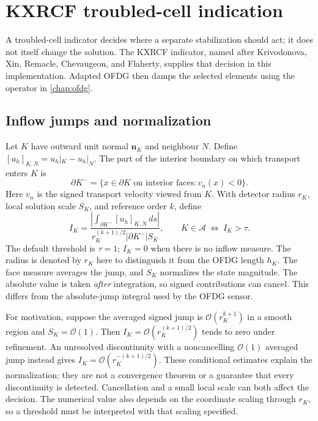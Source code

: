 \section{KXRCF troubled-cell indication}
\label{chap:kxrcf}
A troubled-cell indicator decides where a separate stabilization should act;
it does not itself change the solution. The KXRCF indicator, named after
Krivodonova, Xin, Remacle, Chevaugeon, and Flaherty, supplies that decision in
this implementation. Adapted OFDG then damps the selected elements using the
operator in \cref{chap:ofdg}.


\subsection{Inflow jumps and normalization}
Let $K$ have outward unit normal $\boldsymbol n_K$ and neighbour $N$. Define
$[u_h]_{K,N}=u_h|_K-u_h|_N$. The part of the interior boundary on which
transport enters $K$ is
\begin{equation}
 \partial K^- =\{x\in\partial K\text{ on interior faces}:
                         v_n(x)<0\}.
 \label{eq:kxrcf-inflow}
\end{equation}
Here $v_n$ is the signed transport velocity viewed from $K$. With detector
radius $r_K$, local solution scale $S_K$, and reference order $k$, define
\begin{equation}
 I_K=\frac{\left|\displaystyle\int_{\partial K^-}
                  [u_h]_{K,N}\,ds\right|}
                 {r_K^{(k+1)/2}|\partial K^-|S_K},
 \qquad K\in\mathcal A\ \Longleftrightarrow\ I_K>\tau.
 \label{eq:kxrcf-indicator}
\end{equation}
The default threshold is $\tau=1$; $I_K=0$ when there is no inflow measure.
The radius is denoted by $r_K$ here to distinguish it from the OFDG length
$h_K$. The face measure averages the jump, and $S_K$ normalizes the state
magnitude. The absolute value is taken \emph{after} integration, so signed
contributions can cancel. This differs from the absolute-jump integral used
by the OFDG sensor.

For motivation, suppose the averaged signed jump is
$\mathcal O(r_K^{k+1})$ in a smooth region and $S_K=\mathcal O(1)$.
Then $I_K=\mathcal O(r_K^{(k+1)/2})$ tends to zero under refinement.
An unresolved discontinuity with a noncancelling $\mathcal O(1)$ averaged jump
instead gives $I_K=\mathcal O(r_K^{-(k+1)/2})$. These conditional estimates
explain the normalization; they are not a convergence theorem or a guarantee
that every discontinuity is detected. Cancellation and a small local scale
can both affect the decision. The numerical value also depends on the
coordinate scaling through $r_K$, so a threshold must be interpreted with
that scaling specified.

